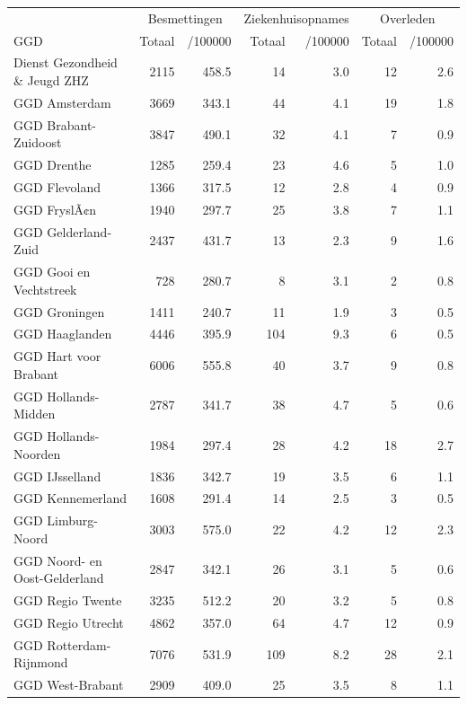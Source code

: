 \documentclass[
  english,
  man,floatsintext]{apa6}
\begin{document}
\begin{table}
\centering\begingroup\fontsize{10}{12}\selectfont

\begin{threeparttable}
\begin{tabular}{lrrrrrr}
\toprule
\multicolumn{1}{c}{ } & \multicolumn{2}{c}{Besmettingen} & \multicolumn{2}{c}{Ziekenhuisopnames} & \multicolumn{2}{c}{Overleden} \\
\cmidrule(l{3pt}r{3pt}){2-3} \cmidrule(l{3pt}r{3pt}){4-5} \cmidrule(l{3pt}r{3pt}){6-7}
GGD & Totaal & /100000 & Totaal & /100000 & Totaal & /100000\\
\midrule
Dienst Gezondheid \& Jeugd ZHZ & 2115 & 458.5 & 14 & 3.0 & 12 & 2.6\\
GGD Amsterdam & 3669 & 343.1 & 44 & 4.1 & 19 & 1.8\\
GGD Brabant-Zuidoost & 3847 & 490.1 & 32 & 4.1 & 7 & 0.9\\
GGD Drenthe & 1285 & 259.4 & 23 & 4.6 & 5 & 1.0\\
GGD Flevoland & 1366 & 317.5 & 12 & 2.8 & 4 & 0.9\\
GGD FryslÃ¢n & 1940 & 297.7 & 25 & 3.8 & 7 & 1.1\\
GGD Gelderland-Zuid & 2437 & 431.7 & 13 & 2.3 & 9 & 1.6\\
GGD Gooi en Vechtstreek & 728 & 280.7 & 8 & 3.1 & 2 & 0.8\\
GGD Groningen & 1411 & 240.7 & 11 & 1.9 & 3 & 0.5\\
GGD Haaglanden & 4446 & 395.9 & 104 & 9.3 & 6 & 0.5\\
GGD Hart voor Brabant & 6006 & 555.8 & 40 & 3.7 & 9 & 0.8\\
GGD Hollands-Midden & 2787 & 341.7 & 38 & 4.7 & 5 & 0.6\\
GGD Hollands-Noorden & 1984 & 297.4 & 28 & 4.2 & 18 & 2.7\\
GGD IJsselland & 1836 & 342.7 & 19 & 3.5 & 6 & 1.1\\
GGD Kennemerland & 1608 & 291.4 & 14 & 2.5 & 3 & 0.5\\
GGD Limburg-Noord & 3003 & 575.0 & 22 & 4.2 & 12 & 2.3\\
GGD Noord- en Oost-Gelderland & 2847 & 342.1 & 26 & 3.1 & 5 & 0.6\\
GGD Regio Twente & 3235 & 512.2 & 20 & 3.2 & 5 & 0.8\\
GGD Regio Utrecht & 4862 & 357.0 & 64 & 4.7 & 12 & 0.9\\
GGD Rotterdam-Rijnmond & 7076 & 531.9 & 109 & 8.2 & 28 & 2.1\\
GGD West-Brabant & 2909 & 409.0 & 25 & 3.5 & 8 & 1.1\\

\end{tabular}
\end{threeparttable}
\end{table}
\end{document}
